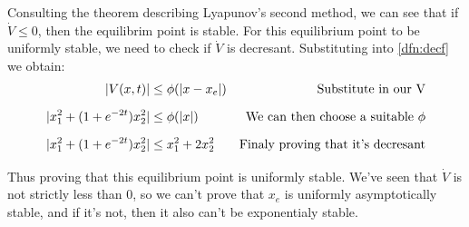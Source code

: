 {    Consulting the theorem describing Lyapunov's second method, we can see that if $\dot{V}\le 0$, then the equilibrim point is stable.
    For this equilibrium point to be uniformly stable, we need to check if $\dot{V}$ is decresant. Substituting into \ref{dfn:decf}
    we obtain:
    \begin{equation}
        \begin{aligned}
        \lvert V(x,t)\rvert&\le \phi(\lvert x-x_e\rvert)&\mbox{Substitute in our V}\\[1.25ex]
        \lvert x_1^{2} + (1+e^{-2t})x_2^{2}\rvert&\le\phi(\lvert x\rvert)&\mbox{We can then choose a suitable $\phi$}\\[1.25ex]   
    \lvert x_1^{2}+(1+e^{-2t})x_2^{2}\rvert&\le x_1^{2}+2x_2^{2}&\mbox{Finaly proving that it's decresant}\\[1.25ex]
        \end{aligned}
    \end{equation}
    Thus proving that this equilibrium point is uniformly stable.
    We've seen that $\dot{V}$ is not strictly less than 0, so we can't prove that
    $x_e$ is uniformly asymptotically stable, and if it's not, then it also can't
    be exponentialy stable.


}

